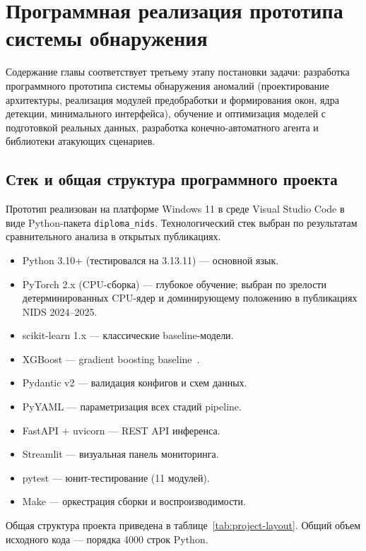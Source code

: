 \section{Программная реализация прототипа системы обнаружения}
\label{ch:impl}

\noindent
Содержание главы соответствует третьему этапу постановки задачи:
разработка программного прототипа системы обнаружения аномалий
(проектирование архитектуры, реализация модулей предобработки и
формирования окон, ядра детекции, минимального интерфейса),
обучение и оптимизация моделей с подготовкой реальных данных,
разработка конечно-автоматного агента и библиотеки атакующих
сценариев.

\subsection{Стек и общая структура программного проекта}

Прототип реализован на платформе Windows 11 в среде Visual Studio
Code в виде Python-пакета \texttt{diploma\_nids}. Технологический
стек выбран по результатам сравнительного анализа в открытых
публикациях.

\begin{itemize}
    \item Python 3.10+ (тестировался на 3.13.11) --- основной язык.
    \item PyTorch 2.x (CPU-сборка) --- глубокое обучение; выбран по
    зрелости детерминированных CPU-ядер и доминирующему положению в
    публикациях NIDS 2024--2025.
    \item scikit-learn 1.x --- классические baseline-модели.
    \item XGBoost --- gradient boosting baseline~\cite{chen2016xgboost}.
    \item Pydantic v2 --- валидация конфигов и схем данных.
    \item PyYAML --- параметризация всех стадий pipeline.
    \item FastAPI + uvicorn --- REST API инференса.
    \item Streamlit --- визуальная панель мониторинга.
    \item pytest --- юнит-тестирование (11 модулей).
    \item Make --- оркестрация сборки и воспроизводимости.
\end{itemize}

Общая структура проекта приведена в таблице~\ref{tab:project-layout}.
Общий объем исходного кода --- порядка 4000 строк Python.

